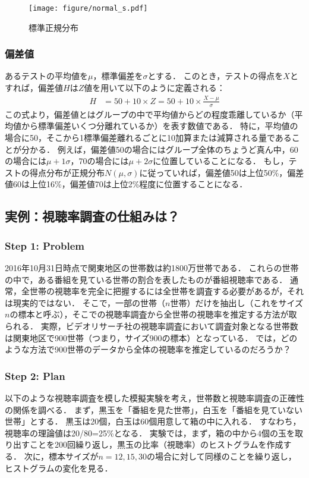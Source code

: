 %
\begin{figure}[H]
	\centering
	\texttt{[image: figure/normal\_s.pdf]}
	\caption{標準正規分布}
	\label{fig:normal_s}
\end{figure}
%

\subsubsection*{偏差値}
%
%
あるテストの平均値を$ \mu $，標準偏差を$ \sigma $とする．
%
このとき，テストの得点を$ X $とすれば，偏差値$ H $は$ Z $値を用いて以下のように定義される：
%
\begin{align}
	H &= 50 + 10\times Z = 50 + 10\times \frac{X-\mu}{\sigma}
	\label{eq:deviation_value}
\end{align}
%
この式より，偏差値とはグループの中で平均値からどの程度乖離しているか（平均値から標準偏差いくつ分離れているか）を表す数値である．
%
特に，平均値の場合に50，そこから1標準偏差離れるごとに10加算または減算される量であることが分かる．
%
例えば，偏差値50の場合にはグループ全体のちょうど真ん中，60の場合には$ \mu+1\sigma $，70の場合には$ \mu+2\sigma $に位置していることになる．
%
もし，テストの得点分布が正規分布$ N(\mu,\sigma) $に従っていれば，偏差値50は上位50\%，偏差値60は上位16\%，偏差値70は上位2\%程度に位置することになる．
%

\clearpage
\subsection{実例：視聴率調査の仕組みは？}
%

\subsubsection*{Step 1: Problem}
%
2016年10月31日時点で関東地区の世帯数は約1800万世帯である．
%
これらの世帯の中で，ある番組を見ている世帯の割合を表したものが番組視聴率である．
%
通常，全世帯の視聴率を完全に把握するには全世帯を調査する必要があるが，それは現実的ではない．
%
そこで，一部の世帯（$ n $世帯）だけを抽出し（これをサイズ$ n $の標本と呼ぶ），そこでの視聴率調査から全世帯の視聴率を推定する方法が取られる．
%
実際，ビデオリサーチ社の視聴率調査において調査対象となる世帯数は関東地区で900世帯（つまり，サイズ900の標本）となっている．
%
では，どのような方法で900世帯のデータから全体の視聴率を推定しているのだろうか？
%

\subsubsection*{Step 2: Plan}
%
以下のような視聴率調査を模した模擬実験を考え，世帯数と視聴率調査の正確性の関係を調べる．
%
まず，黒玉を「番組を見た世帯」，白玉を「番組を見ていない世帯」とする．
%
黒玉は20個，白玉は60個用意して箱の中に入れる．
%
すなわち，視聴率の理論値は20/80=25\%となる．
%
実験では，まず，箱の中から$ 4 $個の玉を取り出すことを200回繰り返し，黒玉の比率（視聴率）のヒストグラムを作成する．
%
次に，標本サイズが$ n=12,15,30 $の場合に対して同様のことを繰り返し，ヒストグラムの変化を見る．
%

